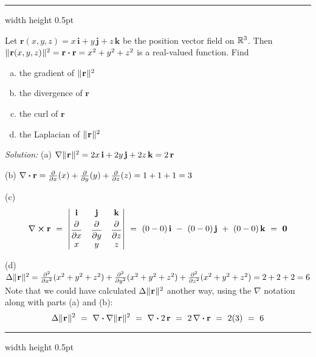 
\medskip
\hrule width \textwidth height 0.5pt
\begin{exmp}\label{exmp:laplposition}
 Let $\mathbf{r}(x,y,z) = x\,\mathbf{i} + y\,\mathbf{j} + z\,\mathbf{k}$ be the position vector field on
 $\mathbb{R}^{3}$. Then $\lVert\mspace{1mu}\mathbf{r}(x,y,z)\mspace{1mu}\rVert^2 = \mathbf{r} \bm{\cdot} \mathbf{r} = x^2 + y^2 + z^2$ is a real-valued
 function. Find
 \begin{enumerate}[(a)]
  \item the gradient of $\lVert\mspace{1mu}\mathbf{r}\mspace{1mu}\rVert^2$
  \item the divergence of $\mathbf{r}$
  \item the curl of $\mathbf{r}$
  \item the Laplacian of $\lVert\mspace{1mu}\mathbf{r}\mspace{1mu}\rVert^2$
 \end{enumerate}

 \par\noindent \emph{Solution:} (a) $\nabla \lVert\mspace{1mu}\mathbf{r}\mspace{1mu}\rVert^2 = 2x\,\mathbf{i} + 2y\,\mathbf{j} + 2z\,\mathbf{k}
  = 2\,\mathbf{r}$\smallskip
 \par\noindent (b) $\nabla \bm{\cdot} \mathbf{r} = \frac{\partial}{\partial x}(x) + \frac{\partial}{\partial y}(y) +
  \frac{\partial}{\partial z}(z) = 1+1+1=3$\smallskip
 \par\noindent (c)
 \begin{displaymath}
  \Crossprod{\nabla}{\mathbf{r}} ~=~ \begin{vmatrix}
  \mathbf{i} & \mathbf{j} & \mathbf{k} \smallskip\\ \dfrac{\partial}{\partial x} & \dfrac{\partial}{\partial y} &
   \dfrac{\partial}{\partial z} \\
  x & y & z
 \end{vmatrix} ~=~ (0-0)\,\mathbf{i} ~-~ (0-0)\,\mathbf{j} ~+~ (0-0)\,\mathbf{k} ~=~ \mathbf{0}
 \end{displaymath}
 \par\noindent (d) $\Delta \lVert\mspace{1mu}\mathbf{r}\mspace{1mu}\rVert^2 = \frac{\partial^2}{\partial x^2}(x^2 + y^2 + z^2 ) +
  \frac{\partial^2}{\partial y^2}(x^2 + y^2 + z^2 ) + \frac{\partial^2}{\partial z^2}(x^2 + y^2 + z^2 ) =
  2+2+2=6$\smallskip\\
  Note that we could have calculated $\Delta \lVert\mspace{1mu}\mathbf{r}\mspace{1mu}\rVert^2$ another way, using the $\nabla$ notation along with
  parts (a) and (b):
  \begin{displaymath}
   \Delta \lVert\mspace{1mu}\mathbf{r}\mspace{1mu}\rVert^2 ~=~ \nabla \bm{\cdot} \nabla \lVert\mspace{1mu}\mathbf{r}\mspace{1mu}\rVert^2 ~=~ \nabla \bm{\cdot} 2\,\mathbf{r} ~=~
   2\,\nabla \bm{\cdot} \mathbf{r} ~=~ 2(3) ~=~ 6
  \end{displaymath}
\end{exmp}
\hrule width \textwidth height 0.5pt
\medskip

